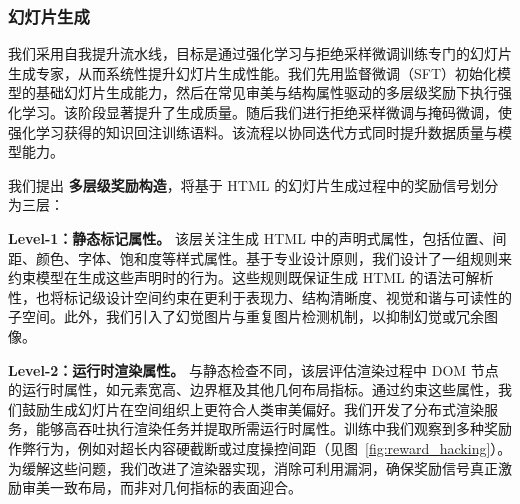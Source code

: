 



\subsubsection{幻灯片生成}

我们采用自我提升流水线，目标是通过强化学习与拒绝采样微调训练专门的幻灯片生成专家，从而系统性提升幻灯片生成性能。我们先用监督微调（SFT）初始化模型的基础幻灯片生成能力，然后在常见审美与结构属性驱动的多层级奖励下执行强化学习。该阶段显著提升了生成质量。随后我们进行拒绝采样微调与掩码微调，使强化学习获得的知识回注训练语料。该流程以协同迭代方式同时提升数据质量与模型能力。

我们提出 \textbf{多层级奖励构造}，将基于 HTML 的幻灯片生成过程中的奖励信号划分为三层：

\textbf{Level-1：静态标记属性。} 该层关注生成 HTML 中的声明式属性，包括位置、间距、颜色、字体、饱和度等样式属性。基于专业设计原则，我们设计了一组规则来约束模型在生成这些声明时的行为。这些规则既保证生成 HTML 的语法可解析性，也将标记级设计空间约束在更利于表现力、结构清晰度、视觉和谐与可读性的子空间。此外，我们引入了幻觉图片与重复图片检测机制，以抑制幻觉或冗余图像。

\textbf{Level-2：运行时渲染属性。} 与静态检查不同，该层评估渲染过程中 DOM 节点的运行时属性，如元素宽高、边界框及其他几何布局指标。通过约束这些属性，我们鼓励生成幻灯片在空间组织上更符合人类审美偏好。我们开发了分布式渲染服务，能够高吞吐执行渲染任务并提取所需运行时属性。训练中我们观察到多种奖励作弊行为，例如对超长内容硬截断或过度操控间距（见图~\ref{fig:reward_hacking}）。为缓解这些问题，我们改进了渲染器实现，消除可利用漏洞，确保奖励信号真正激励审美一致布局，而非对几何指标的表面迎合。

